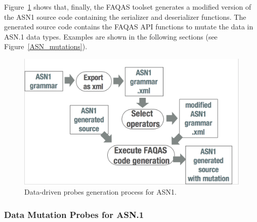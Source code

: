 

Figure~\ref{fig:ASN1ProbesGeneration} shows that, finally, the FAQAS toolset generates a modified version of the ASN1 source code containing the serializer and deserializer functions. The generated source code contains the FAQAS API functions to mutate the data in ASN.1 data types. Examples are shown in the following sections (see Figure~\ref{ASN_mutations}).

\begin{figure}[h]
  \centering
    \includegraphics[width=12cm]{images/ASN1mutationProces}
      \caption{Data-driven probes generation process for ASN1.}
      \label{fig:ASN1ProbesGeneration}
\end{figure}








%



\subsubsection{Data Mutation Probes for ASN.1}
\label{sec:FAQASDataMutationProbesASN}

